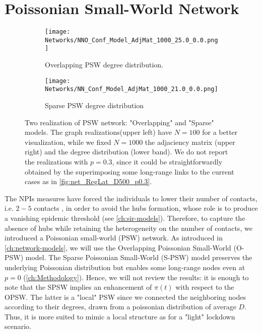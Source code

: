 \documentclass[a4paper,10pt, oneside]{book} %
\theoremstyle{definition}
\begin{document}
\section{Poissonian Small-World Network}
\label{sec:res_PSW}
\begin{figure}[ht]
    \begin{subfigure}{.45\linewidth}
        \texttt{[image: Networks/NNO\_Conf\_Model\_AdjMat\_1000\_25.0\_0.0.png]}
        \centering
        \caption{Overlapping PSW degree distribution. }
        \label{fig:net_O-PSW}
    \end{subfigure}
	\hfill
	\begin{subfigure}{.45\linewidth}
        \texttt{[image: Networks/NN\_Conf\_Model\_AdjMat\_1000\_21.0\_0.0.png]}
        \centering
        \caption{Sparse PSW degree distribution}
        \label{fig:net_S-PSW}
    \end{subfigure}
	\caption{Two realization of PSW network: "Overlapping" and "Sparse" models. The graph realizations(upper left) have $ N = 100$ for a better visualization, while we fixed $ N = 1000$ the adjaciency matrix (upper right) and the degree distribution (lower band). We do not report the realizations with $p = 0.3$, since it could be straightforwardly obtained by the superimposing some long-range links to the current cases as in \autoref{fig:net_RegLat_D500_p0.3}.}
\end{figure}
The NPIs measures have forced the individuals to lower their number of contacts, i.e. $2-5$ contacts \cite{Liu::2021_Review_SContactPattern}, in order to avoid the hubs formation, whose role is to produce a vanishing epidemic threshold (see \autoref{ch:sir-models}).
Therefore, to capture the absence of hubs while retaining the heterogeneity on the number of contacts, we introduced a Poissonian small-world (PSW) network.
As introduced in \autoref{ch:network-models}, we will use the Overlapping Poissonian Small-World (O-PSW) model. The Sparse Poissonian Small-World (S-PSW) model preserves the underlying Poissonian distribution but enables some long-range nodes even at $ p = 0$ (\autoref{ch:Methodology}). Hence, we will not review the results: it is enough to note that the SPSW implies an enhancement of $\pi(t)$ with respect to the OPSW. The latter is a "local" PSW since we connected the neighboring nodes according to their degrees, drawn from a poissonian distribution of average $ D$. Thus, it is more suited to mimic a local structure as for a "light" lockdown scenario.  
\end{document}
